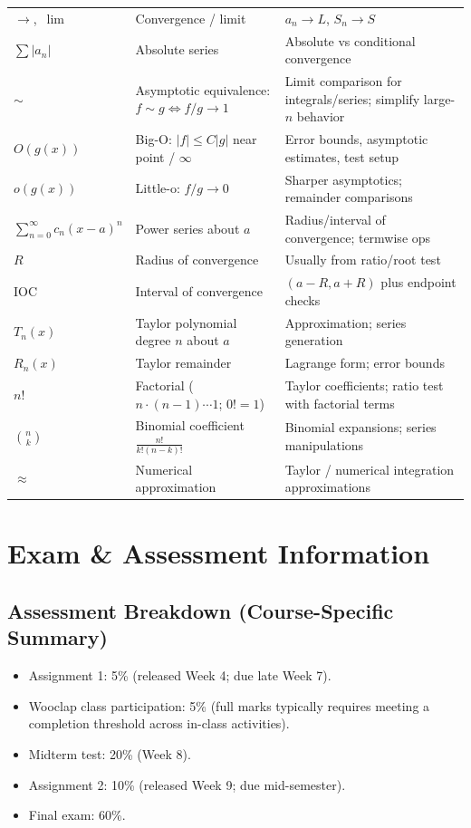 \documentclass[12pt]{article}
\begin{document}
\begin{center}
\begin{tabular}{@{}p{}p{}p{}@{}}
$\to$,\ $\lim$ & Convergence / limit & $a_n\to L$, $S_n\to S$ \\
$\sum |a_n|$ & Absolute series & Absolute vs conditional convergence \\
$\sim$ & Asymptotic equivalence: $f\sim g\iff f/g\to 1$ & Limit comparison for integrals/series; simplify large-$n$ behavior \\
$O(g(x))$ & Big-O: $|f|\le C|g|$ near point / $\infty$ & Error bounds, asymptotic estimates, test setup \\
$o(g(x))$ & Little-o: $f/g\to 0$ & Sharper asymptotics; remainder comparisons \\
$\displaystyle \sum_{n=0}^{\infty} c_n(x-a)^n$ & Power series about $a$ & Radius/interval of convergence; termwise ops \\
$R$ & Radius of convergence & Usually from ratio/root test \\
IOC & Interval of convergence & $(a-R,a+R)$ plus endpoint checks \\
$T_n(x)$ & Taylor polynomial degree $n$ about $a$ & Approximation; series generation \\
$R_n(x)$ & Taylor remainder & Lagrange form; error bounds \\
$n!$ & Factorial ($n\cdot(n-1)\cdots 1$; $0!=1$) & Taylor coefficients; ratio test with factorial terms \\
$\binom{n}{k}$ & Binomial coefficient $\frac{n!}{k!(n-k)!}$ & Binomial expansions; series manipulations \\
$\approx$ & Numerical approximation & Taylor / numerical integration approximations \\
\bottomrule
\end{tabular}
\end{center}


\newpage
\section{Exam \& Assessment Information}

\subsection{Assessment Breakdown (Course-Specific Summary)}
\begin{itemize}
  \item Assignment 1: 5\% (released Week 4; due late Week 7).
  \item Wooclap class participation: 5\% (full marks typically requires meeting a completion threshold across in-class activities).
  \item Midterm test: 20\% (Week 8).
  \item Assignment 2: 10\% (released Week 9; due mid-semester).
  \item Final exam: 60\%.
\end{itemize}
\end{document}

